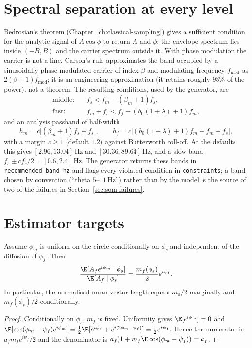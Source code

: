 \section{Spectral separation at every level}
Bedrosian's theorem (Chapter~\ref{ch:classical-sampling}) gives a
sufficient condition for the analytic signal of $A\cos\phi$ to return
$A$ and $\phi$: the envelope spectrum lies inside $(-B,B)$ and the
carrier spectrum outside it. With phase modulation the carrier is not a
line. Carson's rule \cite{carson1922} approximates the band occupied by a
sinusoidally phase-modulated carrier of index $\beta$ and modulating
frequency $f_{\mathrm{mod}}$ as $2(\beta+1)f_{\mathrm{mod}}$; it is an
engineering approximation (it retains roughly $98\%$ of the power), not a
theorem. The resulting conditions, used by the generator, are
\begin{align*}
\text{middle:}&\quad f_s<f_m-(\beta_m+1)f_s,\\
\text{fast:}&\quad f_m+f_s<f_f-(b_0(1+\lambda)+1)f_m,
\end{align*}
and an analysis passband of half-width
\[
h_m=c\bigl[(\beta_m+1)f_s+f_s\bigr],\qquad
h_f=c\bigl[(b_0(1+\lambda)+1)f_m+f_m+f_s\bigr],
\]
with a margin $c\ge1$ (default $1.2$) against Butterworth roll-off. At the
defaults this gives $[2.96,13.04]$\,Hz and $[30.36,89.64]$\,Hz, and a slow
band $f_s\pm cf_s/2=[0.6,2.4]$\,Hz. The generator returns these bands in
\texttt{recommended\_band\_hz} and flags every violated condition in
\texttt{constraints}; a band chosen by convention (``theta $5$--$11$\,Hz'')
rather than by the model is the source of two of the failures in
Section~\ref{sec:som-failures}.

\section{Estimator targets}
\begin{proposition}
\label{prop:som-mvl}
Assume $\phi_m$ is uniform on the circle conditionally on $\phi_s$ and
independent of the diffusion of $\phi_f$. Then
\[
\frac{\E[A_fe^{i\phi_m}\mid\phi_s]}{\E[A_f\mid\phi_s]}
=\frac{m_f(\phi_s)}{2}e^{i\psi_f}.
\]
In particular, the normalised mean-vector length equals $m_0/2$
marginally and $m_f(\phi_s)/2$ conditionally.
\end{proposition}
\begin{proof}
Conditionally on $\phi_s$, $m_f$ is fixed. Uniformity gives
$\E[e^{i\phi_m}]=0$ and $\E[\cos(\phi_m-\psi_f)e^{i\phi_m}]
=\tfrac12\E[e^{i\psi_f}+e^{i(2\phi_m-\psi_f)}]=\tfrac12e^{i\psi_f}$.
Hence the numerator is $a_fm_fe^{i\psi_f}/2$ and the denominator is
$a_f(1+m_f\E\cos(\phi_m-\psi_f))=a_f$.
\end{proof}

